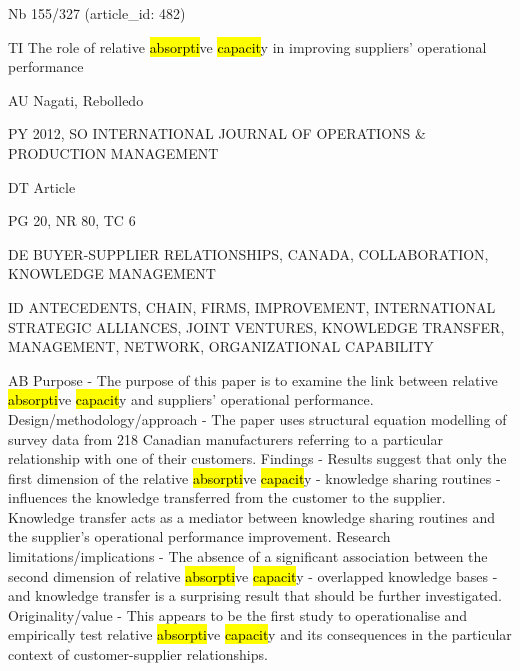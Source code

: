 \documentclass[a4paper]{article}
\begin{document}
\vspace*{-2cm}
Nb \tabto{0cm}155/327 (article\_id: 482)\par
TI \tabto{0cm}The role of relative \hl{absorpti}ve \hl{capacit}y in improving suppliers' operational performance\par
AU \tabto{0cm}Nagati, Rebolledo\par
PY \tabto{0cm}2012, SO INTERNATIONAL JOURNAL OF OPERATIONS \& PRODUCTION MANAGEMENT\par
DT \tabto{0cm}Article\par
PG \tabto{0cm}20, NR 80, TC 6\par
DE \tabto{0cm}BUYER-SUPPLIER RELATIONSHIPS, CANADA, COLLABORATION, KNOWLEDGE MANAGEMENT\par
ID \tabto{0cm}ANTECEDENTS, CHAIN, FIRMS, IMPROVEMENT, INTERNATIONAL STRATEGIC ALLIANCES, JOINT VENTURES, KNOWLEDGE TRANSFER, MANAGEMENT, NETWORK, ORGANIZATIONAL CAPABILITY\par
AB \tabto{0cm}Purpose - The purpose of this paper is to examine the link between relative \hl{absorpti}ve \hl{capacit}y and suppliers' operational performance.
Design/methodology/approach - The paper uses structural equation modelling of survey data from 218 Canadian manufacturers referring to a particular relationship with one of their customers.
Findings - Results suggest that only the first dimension of the relative \hl{absorpti}ve \hl{capacit}y - knowledge sharing routines - influences the knowledge transferred from the customer to the supplier. Knowledge transfer acts as a mediator between knowledge sharing routines and the supplier's operational performance improvement.
Research limitations/implications - The absence of a significant association between the second dimension of relative \hl{absorpti}ve \hl{capacit}y - overlapped knowledge bases - and knowledge transfer is a surprising result that should be further investigated.
Originality/value - This appears to be the first study to operationalise and empirically test relative \hl{absorpti}ve \hl{capacit}y and its consequences in the particular context of customer-supplier relationships.\par
\clearpage
\end{document}
